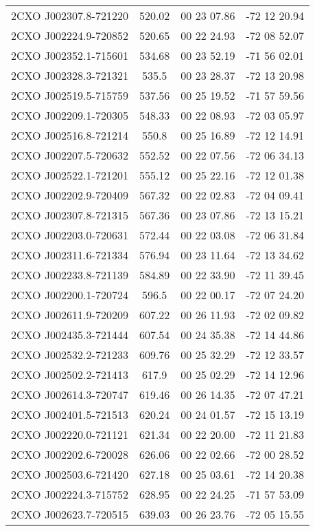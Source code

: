\begin{table}
\begin{tabular}{cccc}
2CXO J002307.8-721220 & 520.02 & 00 23 07.86 & -72 12 20.94 \\
2CXO J002224.9-720852 & 520.65 & 00 22 24.93 & -72 08 52.07 \\
2CXO J002352.1-715601 & 534.68 & 00 23 52.19 & -71 56 02.01 \\
2CXO J002328.3-721321 & 535.5 & 00 23 28.37 & -72 13 20.98 \\
2CXO J002519.5-715759 & 537.56 & 00 25 19.52 & -71 57 59.56 \\
2CXO J002209.1-720305 & 548.33 & 00 22 08.93 & -72 03 05.97 \\
2CXO J002516.8-721214 & 550.8 & 00 25 16.89 & -72 12 14.91 \\
2CXO J002207.5-720632 & 552.52 & 00 22 07.56 & -72 06 34.13 \\
2CXO J002522.1-721201 & 555.12 & 00 25 22.16 & -72 12 01.38 \\
2CXO J002202.9-720409 & 567.32 & 00 22 02.83 & -72 04 09.41 \\
2CXO J002307.8-721315 & 567.36 & 00 23 07.86 & -72 13 15.21 \\
2CXO J002203.0-720631 & 572.44 & 00 22 03.08 & -72 06 31.84 \\
2CXO J002311.6-721334 & 576.94 & 00 23 11.64 & -72 13 34.62 \\
2CXO J002233.8-721139 & 584.89 & 00 22 33.90 & -72 11 39.45 \\
2CXO J002200.1-720724 & 596.5 & 00 22 00.17 & -72 07 24.20 \\
2CXO J002611.9-720209 & 607.22 & 00 26 11.93 & -72 02 09.82 \\
2CXO J002435.3-721444 & 607.54 & 00 24 35.38 & -72 14 44.86 \\
2CXO J002532.2-721233 & 609.76 & 00 25 32.29 & -72 12 33.57 \\
2CXO J002502.2-721413 & 617.9 & 00 25 02.29 & -72 14 12.96 \\
2CXO J002614.3-720747 & 619.46 & 00 26 14.35 & -72 07 47.21 \\
2CXO J002401.5-721513 & 620.24 & 00 24 01.57 & -72 15 13.19 \\
2CXO J002220.0-721121 & 621.34 & 00 22 20.00 & -72 11 21.83 \\
2CXO J002202.6-720028 & 626.06 & 00 22 02.66 & -72 00 28.52 \\
2CXO J002503.6-721420 & 627.18 & 00 25 03.61 & -72 14 20.38 \\
2CXO J002224.3-715752 & 628.95 & 00 22 24.25 & -71 57 53.09 \\
2CXO J002623.7-720515 & 639.03 & 00 26 23.76 & -72 05 15.55 \\

\end{tabular}
\end{table}
